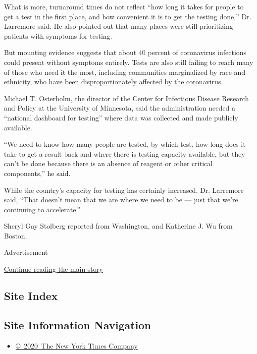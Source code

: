 What is more, turnaround times do not reflect ``how long it takes for
people to get a test in the first place, and how convenient it is to get
the testing done,'' Dr. Larremore said. He also pointed out that many
places were still prioritizing patients with symptoms for testing.

But mounting evidence suggests that about 40 percent of coronavirus
infections could present without symptoms entirely. Tests are also still
failing to reach many of those who need it the most, including
communities marginalized by race and ethnicity, who have been
\href{https://www.nytimes.com/interactive/2020/07/05/us/coronavirus-latinos-african-americans-cdc-data.html}{disproportionately
affected by the coronavirus}.

Michael T. Osterholm, the director of the Center for Infectious Disease
Research and Policy at the University of Minnesota, said the
administration needed a ``national dashboard for testing'' where data
was collected and made publicly available.

``We need to know how many people are tested, by which test, how long
does it take to get a result back and where there is testing capacity
available, but they can't be done because there is an absence of reagent
or other critical components,'' he said.

While the country's capacity for testing has certainly increased, Dr.
Larremore said, ``That doesn't mean that we are where we need to be ---
just that we're continuing to accelerate.''

Sheryl Gay Stolberg reported from Washington, and Katherine J. Wu from
Boston.

Advertisement

\protect\hyperlink{after-bottom}{Continue reading the main story}

\hypertarget{site-index}{%
\subsection{Site Index}\label{site-index}}

\hypertarget{site-information-navigation}{%
\subsection{Site Information
Navigation}\label{site-information-navigation}}

\begin{itemize}
\tightlist
\item
  \href{https://help.nytimes.com/hc/en-us/articles/115014792127-Copyright-notice}{©~2020~The
  New York Times Company}
\end{itemize}

